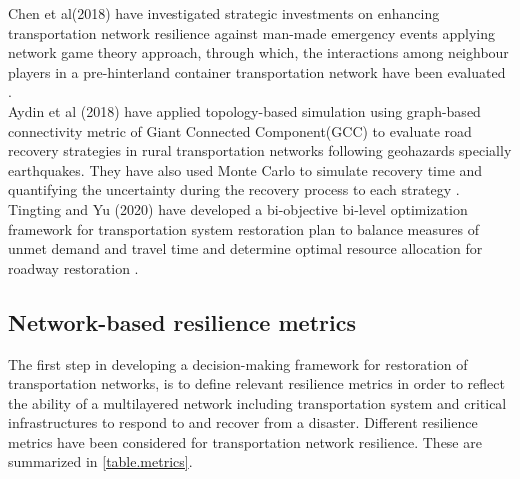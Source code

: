 \documentclass[11pt,twoside]{article}
\numberwithin{equation}{section}
\newcommand{\?}{\stackrel{?}{=}}
\begin{document}
 Chen et al(2018) have investigated strategic investments on enhancing transportation network resilience against man-made emergency events applying network game theory approach, through which, the interactions among neighbour players in a pre-hinterland container transportation network have been evaluated \citep{hong2018strategic}.\\
 Aydin et al (2018) have applied topology-based simulation using graph-based connectivity metric of Giant Connected Component(GCC) to evaluate road recovery strategies in rural transportation networks following geohazards specially earthquakes. They have also used Monte Carlo to simulate recovery time and quantifying the uncertainty during the recovery process to each strategy \citep{aydin2018framework}.\\
 Tingting and Yu (2020) have developed a bi-objective bi-level optimization framework for transportation system
 restoration plan to balance measures of unmet demand and travel time and determine optimal resource allocation for
 roadway restoration \citep{tingting2020transportation}.

\subsection{Network-based resilience metrics}
The first step in developing a decision-making framework for restoration of transportation networks, is to define
relevant resilience metrics in order to reflect the ability of a multilayered network including transportation system
and critical infrastructures to respond to and recover from a disaster. Different resilience metrics have been
considered for transportation network resilience. These are summarized in \autoref{table.metrics}.
\end{document}
